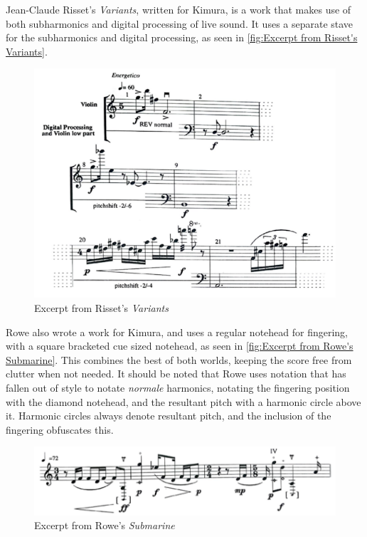 
Jean-Claude Risset's \emph{Variants}, written for Kimura, is a work that makes use of both subharmonics and digital processing of live sound.\autocite[]{rissetVariants1995}
It uses a separate stave for the subharmonics and digital processing, as seen in \autoref{fig:Excerpt from Risset's Variants}. 

\begin{figure}
  \includegraphics[width=\linewidth]{./resources/rissetALFExcerpt.pdf}
  \caption{Excerpt from Risset's \emph{Variants}}
\label{fig:Excerpt from Risset's Variants}
\end{figure}

Rowe also wrote a work for Kimura, and uses a regular notehead for fingering, with a square bracketed cue sized notehead, as seen in \autoref{fig:Excerpt from Rowe's Submarine}.\autocite[]{roweSubmarine1996}
This combines the best of both worlds, keeping the score free from clutter when not needed.
It should be noted that Rowe uses notation that has fallen out of style to notate \emph{normale} harmonics, notating the fingering position with the diamond notehead, and the resultant pitch with a harmonic circle above it. 
Harmonic circles always denote resultant pitch, and the inclusion of the fingering obfuscates this.\autocite[420]{gouldBars2011}


\begin{figure}
  \includegraphics[width=\linewidth]{./resources/roweALFExcerpt.pdf}
  \caption{Excerpt from Rowe's \emph{Submarine}}
\label{fig:Excerpt from Rowe's Submarine}
\end{figure}


